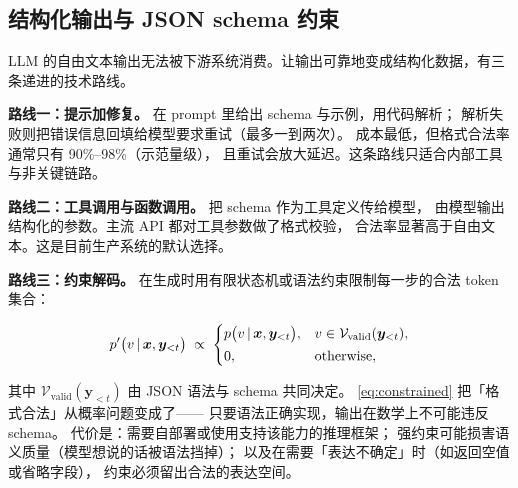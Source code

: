 \subsection{结构化输出与 JSON schema 约束}

LLM 的自由文本输出无法被下游系统消费。让输出可靠地变成结构化数据，有三条递进的技术路线。

\textbf{路线一：提示加修复。} 在 prompt 里给出 schema 与示例，用代码解析；
解析失败则把错误信息回填给模型要求重试（最多一到两次）。
成本最低，但格式合法率通常只有 90\%--98\%（示范量级），
且重试会放大延迟。这条路线只适合内部工具与非关键链路。

\textbf{路线二：工具调用与函数调用。} 把 schema 作为工具定义传给模型，
由模型输出结构化的参数。主流 API 都对工具参数做了格式校验，
合法率显著高于自由文本。这是目前生产系统的默认选择。

\textbf{路线三：约束解码。} 在生成时用有限状态机或语法约束限制每一步的合法 token 集合：

\begin{equation}
p'\big(v \,\vert\, \bm{x}, \bm{y}_{<t}\big) \;\propto\;
\begin{cases}
p\big(v \,\vert\, \bm{x}, \bm{y}_{<t}\big), & v \in \mathcal{V}_{\text{valid}}(\bm{y}_{<t}),\\[2pt]
0, & \text{otherwise},
\end{cases}
\label{eq:constrained}
\end{equation}

其中 $\mathcal{V}_{\text{valid}}(\bm{y}_{<t})$ 由 JSON 语法与 schema 共同决定。
\cref{eq:constrained} 把「格式合法」从概率问题变成了——
只要语法正确实现，输出在数学上不可能违反 schema。
代价是：需要自部署或使用支持该能力的推理框架；
强约束可能损害语义质量（模型想说的话被语法挡掉）；
以及在需要「表达不确定」时（如返回空值或省略字段），
约束必须留出合法的表达空间。

